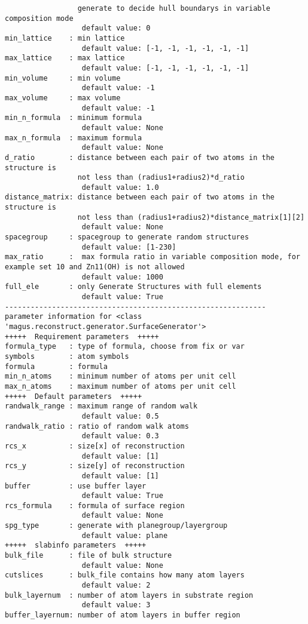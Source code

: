 \documentclass[12pt,oneside]{book}
\begin{document}
\begin{tcolorbox}
\begin{verbatim}
                 generate to decide hull boundarys in variable composition mode
                  default value: 0
min_lattice    : min lattice
                  default value: [-1, -1, -1, -1, -1, -1]
max_lattice    : max lattice
                  default value: [-1, -1, -1, -1, -1, -1]
min_volume     : min volume
                  default value: -1
max_volume     : max volume
                  default value: -1
min_n_formula  : minimum formula
                  default value: None
max_n_formula  : maximum formula
                  default value: None
d_ratio        : distance between each pair of two atoms in the structure is
                 not less than (radius1+radius2)*d_ratio
                  default value: 1.0
distance_matrix: distance between each pair of two atoms in the structure is
                 not less than (radius1+radius2)*distance_matrix[1][2]
                  default value: None
spacegroup     : spacegroup to generate random structures
                  default value: [1-230]
max_ratio      :  max formula ratio in variable composition mode, for example set 10 and Zn11(OH) is not allowed
                  default value: 1000
full_ele       : only Generate Structures with full elements
                  default value: True
-------------------------------------------------------------
parameter information for <class 'magus.reconstruct.generator.SurfaceGenerator'>
+++++  Requirement parameters  +++++
formula_type   : type of formula, choose from fix or var
symbols        : atom symbols
formula        : formula
min_n_atoms    : minimum number of atoms per unit cell
max_n_atoms    : maximum number of atoms per unit cell
+++++  Default parameters  +++++
randwalk_range : maximum range of random walk
                  default value: 0.5
randwalk_ratio : ratio of random walk atoms
                  default value: 0.3
rcs_x          : size[x] of reconstruction
                  default value: [1]
rcs_y          : size[y] of reconstruction
                  default value: [1]
buffer         : use buffer layer
                  default value: True
rcs_formula    : formula of surface region
                  default value: None
spg_type       : generate with planegroup/layergroup
                  default value: plane
+++++  slabinfo parameters  +++++
bulk_file      : file of bulk structure
                  default value: None
cutslices      : bulk_file contains how many atom layers
                  default value: 2
bulk_layernum  : number of atom layers in substrate region
                  default value: 3
buffer_layernum: number of atom layers in buffer region

\end{verbatim}
\end{tcolorbox}
\end{document}
